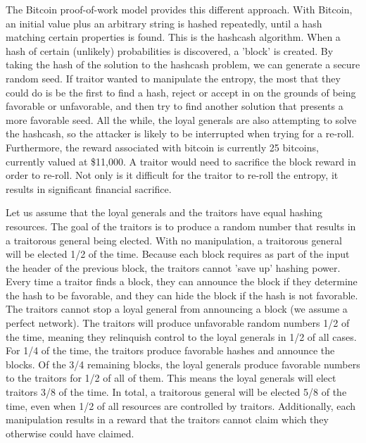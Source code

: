 \documentclass[twocolumn]{article}
\begin{document}
The Bitcoin proof-of-work model provides this different approach.
With Bitcoin, an initial value plus an arbitrary string is hashed repeatedly, until a hash matching certain properties is found.
This is the hashcash algorithm.
When a hash of certain (unlikely) probabilities is discovered, a 'block' is created.
By taking the hash of the solution to the hashcash problem, we can generate a secure random seed.
If traitor wanted to manipulate the entropy, the most that they could do is be the first to find a hash, reject or accept in on the grounds of being favorable or unfavorable, and then try to find another solution that presents a more favorable seed.
All the while, the loyal generals are also attempting to solve the hashcash, so the attacker is likely to be interrupted when trying for a re-roll.
Furthermore, the reward associated with bitcoin is currently 25 bitcoins, currently valued at \$11,000.
A traitor would need to sacrifice the block reward in order to re-roll.
Not only is it difficult for the traitor to re-roll the entropy, it results in significant financial sacrifice.

Let us assume that the loyal generals and the traitors have equal hashing resources.
The goal of the traitors is to produce a random number that results in a traitorous general being elected.
With no manipulation, a traitorous general will be elected 1/2 of the time.
Because each block requires as part of the input the header of the previous block, the traitors cannot 'save up' hashing power.
Every time a traitor finds a block, they can announce the block if they determine the hash to be favorable, and they can hide the block if the hash is not favorable.
The traitors cannot stop a loyal general from announcing a block (we assume a perfect network).
The traitors will produce unfavorable random numbers 1/2 of the time, meaning they relinquish control to the loyal generals in 1/2 of all cases.
For 1/4 of the time, the traitors produce favorable hashes and announce the blocks.
Of the 3/4 remaining blocks, the loyal generals produce favorable numbers to the traitors for 1/2 of all of them.
This means the loyal generals will elect traitors 3/8 of the time.
In total, a traitorous general will be elected 5/8 of the time, even when 1/2 of all resources are controlled by traitors.
Additionally, each manipulation results in a reward that the traitors cannot claim which they otherwise could have claimed.
\end{document}
